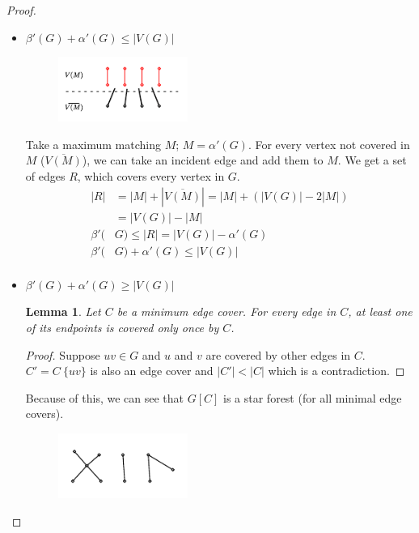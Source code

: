 \documentclass[notitlepage, 12pt]{article}
\newtheorem*{lemma}{Lemma}
\begin{document}
\begin{proof}
\begin{itemize}
    \item[(1)] $\beta'(G) + \alpha'(G) \leq |V(G)|$ \\ \newline
    \begin{figure}[h]
      \includegraphics[width=0.4\textwidth]{gallois-theorem-1.pdf}
      \centering
    \end{figure}
    Take a maximum matching $M$; $M = \alpha'(G)$. For every vertex not covered
    in $M$ ($\overline{V(M)}$), we can take an incident edge and add them to $M$.
    We get a set of edges $R$, which covers every vertex in $G$.
    \begin{align*}
      |R| &= |M| + |\overline{V(M)}| = |M| + (|V(G)| - 2|M|)\\
      &= |V(G)| - |M|\\
      \beta'(&G) \leq |R| = |V(G)| - \alpha'(G)\\
      \beta'(&G) + \alpha'(G) \leq |V(G)|\\
    \end{align*}
  \item[(2)] $\beta'(G) + \alpha'(G) \geq |V(G)|$ \\ \newline
  \begin{lemma}
    Let $C$ be a minimum edge cover. For every edge in $C$, at least one of its
    endpoints is covered only once by $C$.
  \end{lemma}
  \begin{proof}
    Suppose $uv \in G$ and $u$ and $v$ are covered by other edges in $C$.
    $C' = C\ \{uv\}$ is also an edge cover and $|C'| < |C|$ which is a contradiction.
  \end{proof}
  Because of this, we can see that $G[C]$ is a star forest (for all minimal edge covers).
  \begin{figure}[h]
    \includegraphics[width=0.4\textwidth]{gallois-part-2-star.pdf}

\end{figure}
\end{itemize}
\end{proof}
\end{document}
